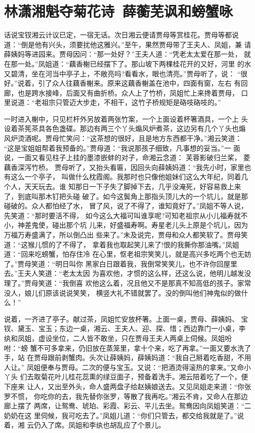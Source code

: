 \chapter{林潇湘魁夺菊花诗~薛蘅芜讽和螃蟹咏}

话说宝钗湘云计议已定，一宿无话。次日湘云便请贾母等赏桂花。贾母等都说
道：“倒是他有兴头，须要扰他这雅兴。”至午，果然贾母带了王夫人、凤姐，兼
请薛姨妈等进园来。贾母因问：“那一处好？”王夫人道：“凭老太太爱在那一处，
就在那一处。”凤姐道：“藕香榭已经摆下了。那山坡下两棵桂花开的又好，河里
的水又碧清，坐在河当中亭子上，不敞亮吗?看看水，眼也清亮。”贾母听了，说：
“很好。”说着，引了众人往藕香榭来。原来这藕香榭盖在池中，四面有窗，左右
有回廊，也是跨水接峰，后面又有曲折桥。众人上了竹桥，凤姐忙上来搀着贾母，
口里说道：“老祖宗只管迈大步走，不相干，这竹子桥规矩是硌吱硌吱的。”

一时进入榭中，只见栏杆外另放着两张竹案，一个上面设着杯箸酒具，一个上
头设着茶筅茶具各色盏碟。那边有两三个丫头煽风炉煮茶，这边另有几个丫头也煽
风炉烫酒呢。贾母忙笑问：“这茶想的很好，且是地方东西都干净。”湘云笑道：
“这是宝姐姐帮着我预备的。”贾母道：“我说那孩子细致，凡事想的妥当。”一
面说，一面又看见柱子上挂的墨漆嵌蚌的对子，命湘云念道：
芙蓉影破归兰桨，
菱藕香深泻竹桥。
贾母听了，又抬头看匾，因回头向薛姨妈道：“我先小时，家里也有这么一个亭子，
叫做什么枕霞阁。我那时也只像他姐妹们这么大年纪，同着几个人，天天玩去。谁
知那日一下子失了脚掉下去，几乎没淹死，好容易救上来了，到底叫那木钉把头碰
破了。如今这鬓角上那指头顶儿大的一个坑儿，就是那碰破的。众人都怕经了水，
冒了风，说了不得了，谁知竟好了。”凤姐不等人说，先笑道：“那时要活不得，
如今这么大福可叫谁享呢?可知老祖宗从小儿福寿就不小，神差鬼使，碰出那个坑
儿来，好盛福寿啊。寿星老儿头上原是个坑儿，因为万福万寿盛满了，所以倒凸出
些来了。”未及说完，贾母和众人都笑软了。贾母笑道：“这猴儿惯的了不得了，
拿着我也取起笑儿来了!恨的我撕你那油嘴。”凤姐道：“回来吃螃蟹，怕存住冷
在心里，怄老祖宗笑笑儿，就是高兴多吃两个也无妨了。”贾母笑道：“明日叫你
黑家白日跟着我，我倒常笑笑儿，也不许你回屋里去。”王夫人笑道：“老太太因
为喜欢他，才惯的这么样，还这么说，他明儿越发没理了。”贾母笑道：“我倒喜
欢他这么着，况且他又不是那真不知高低的孩子。家常没人，娘儿们原该说说笑笑，
横竖大礼不错就罢了。没的倒叫他们神鬼似的做什么！”

说着，一齐进了亭子。献过茶，凤姐忙安放杯箸。上面一桌，贾母、薛姨妈、
宝钗、黛玉、宝玉；东边一桌，湘云、王夫人、迎、探、惜；西边靠门一小桌，李
纨和凤姐，虚设坐位，二人皆不敢坐，只在贾母王夫人两桌上伺候。凤姐吩咐：“螃
蟹不可多拿来，仍旧放在蒸笼里，拿十个来，吃了再拿。”一面又要水洗了手，站
在贾母跟前剥蟹肉。头次让薛姨妈，薛姨妈道：“我自己掰着吃香甜，不用人让。”
凤姐便奉与贾母。二次的便与宝玉。又说：“把酒烫得滚热的拿来。”又命小丫头
们去取菊花叶儿桂花蕊熏的绿豆面子，预备着洗手。湘云陪着吃了一个，便下座来
让人，又出至外头，命人盛两盘子给赵姨娘送去。又见凤姐走来道：“你张罗不惯，
你吃你的去，我先替你张罗，等散了我再吃。”湘云不肯，又命人在那边廊上摆了
两席，让鸳鸯、琥珀、彩霞、彩云、平儿去坐。鸳鸯因向凤姐笑道：“二奶奶在这
里伺候，我可吃去了。”凤姐儿道：“你们只管去，都交给我就是了。”说着，湘
云仍入了席。凤姐和李纨也胡乱应了个景儿。

